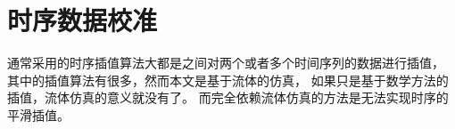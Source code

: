 \section{时序数据校准}
\label{sec:time_var_update}
通常采用的时序插值算法大都是之间对两个或者多个时间序列的数据进行插值，
其中的插值算法有很多，然而本文是基于流体的仿真，
如果只是基于数学方法的插值，流体仿真的意义就没有了。
而完全依赖流体仿真的方法是无法实现时序的平滑插值。




























